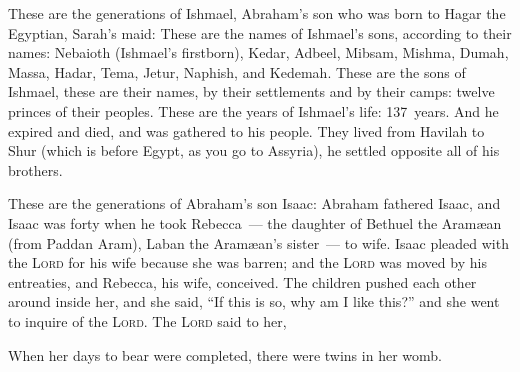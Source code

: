 \begin{inparaenum}
     These are the generations of Ishmael, Abraham's son who was born to Hagar the Egyptian, Sarah's maid:%
     These are the names of Ishmael's sons, according to their names: Nebaioth (Ishmael's firstborn), Kedar, Adbeel, Mibsam,%
     Mishma, Dumah, Massa,%
     Hadar, Tema, Jetur, Naphish, and Kedemah.%
     These are the sons of Ishmael, these are their names, by their settlements and by their camps: twelve princes of their peoples.%
     These are the years of Ishmael's life: 137~years. And he expired and died, and was gathered to his people.%
     They lived from Havilah to Shur (which is before Egypt, as you go to Assyria), he settled opposite all of his brothers.%
    
     These are the generations of Abraham's son Isaac: Abraham fathered Isaac,%
     and Isaac was forty when he took Rebecca~--- the daughter of Bethuel the Aram\ae an (from Paddan Aram), Laban the Aram\ae an's sister~--- to wife.%
     Isaac pleaded with the \textsc{Lord} for his wife because she was barren; and the \textsc{Lord} was moved by his entreaties, and Rebecca, his wife, conceived.%
     The children pushed each other around inside her, and she said, ``If this is so, why am I like this?'' and she went to inquire of the \textsc{Lord}.%
     The \textsc{Lord} said to her,\smallskip%
    
    
    
     When her days to bear were completed, there were twins in her womb.%
\end{inparaenum}
